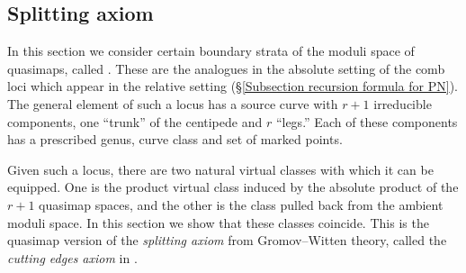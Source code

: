 \subsection{Splitting axiom} \label{Subsection splitting}

In this section we consider certain boundary strata of the moduli space of quasimaps, called . These are the analogues in the absolute setting of the comb loci which appear in the relative setting (\S \ref{Subsection recursion formula for PN}). The general element of such a locus has a source curve with $r+1$ irreducible components, one ``trunk'' of the centipede and $r$ ``legs.'' Each of these components has a prescribed genus, curve class and set of marked points.

Given such a locus, there are two natural virtual classes with which it can be equipped. One is the product virtual class induced by the absolute product of the $r+1$ quasimap spaces, and the other is the class pulled back from the ambient moduli space. In this section we show that these classes coincide. This is the quasimap version of the \emph{splitting axiom} from Gromov--Witten theory, called the \emph{cutting edges axiom} in \cite{Behrend}.

